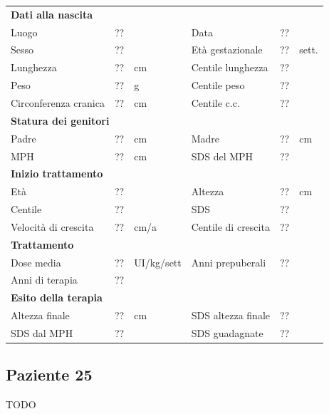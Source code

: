 \begin{table}[!h]
\begin{tabular}{lrllrl}
\toprule
\multicolumn{6}{l}{\textbf{Dati alla nascita}}\\
Luogo 		& \multicolumn{2}{l}{??} 	& Data 					& \multicolumn{2}{l}{??} 	\\
Sesso 		& \multicolumn{2}{l}{??} 	& Età gestazionale 		& ?? 		& sett.\\
Lunghezza 	& ?? 		& cm 				& Centile lunghezza		& ?? 		\\
Peso 		& ?? 		& g					& Centile peso			& ?? 		\\
Circonferenza cranica	& ?? 		& cm 	& Centile c.c.			& ?? \\
\midrule
\multicolumn{6}{l}{\textbf{Statura dei genitori}}\\
Padre 		& ?? & cm 	& Madre 				& ?? & cm \\
MPH 		& ?? & cm 	& SDS del MPH 			& ??\\
\midrule
\multicolumn{6}{l}{\textbf{Inizio trattamento}} \\
Età	& ?? & 		& Altezza 				& ?? & cm  \\
Centile & ?? 	 &		& SDS		& ?? \\
Velocità di crescita & ?? & cm/a	& Centile di crescita & ??\\
\midrule
\multicolumn{6}{l}{\textbf{Trattamento}} \\
Dose media		& ?? & UI/kg/sett & Anni prepuberali & ??\\
Anni di terapia & ??\\
\midrule
\multicolumn{6}{l}{\textbf{Esito della terapia}} \\
Altezza finale			& ?? & cm 	& SDS altezza finale		& ??\\
SDS dal MPH				& ?? &		& SDS guadagnate 			& ??\\
\bottomrule
\end{tabular}
\end{table}
\clearpage


\subsection*{Paziente 25}

TODO

